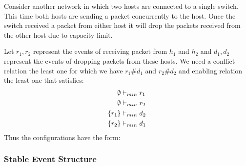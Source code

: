 \begin{example}
    Consider another network in which two hosts are connected
    to a single switch.
    This time both hosts are sending a packet concurrently to the
    host.
    Once the switch received a packet from either host it will
    drop the packets received from the other host due to capacity
    limit.
    \begin{center}
    \end{center}
    Let $r_1,r_2$ represent the events of receiving packet from
    $h_1$ and $h_2$ and $d_1,d_2$ represent the events of dropping
    packets from these hosts.
    We need a conflict relation the least one for which we have
    $r_1\#d_1$ and $r_2\#d_2$
    and enabling relation the least one that satisfies:
    \begin{align*}
        \emptyset & \vdash_{min} r_1 \\
        \emptyset & \vdash_{min} r_2 \\
        \{r_1\}   & \vdash_{min} d_2 \\
        \{r_2\}   & \vdash_{min} d_1 \\
    \end{align*}
    Thus the configurations have the form:
    \begin{center}
    \end{center}
\end{example}

\subsubsection{Stable Event Structure}

